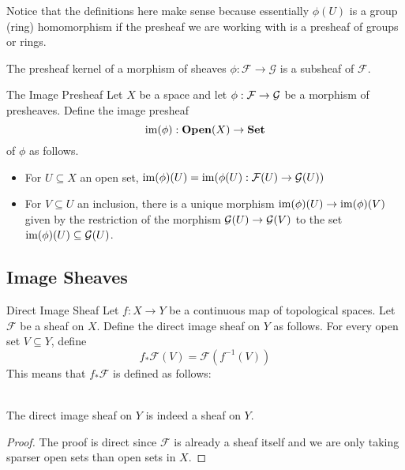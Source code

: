 \documentclass[a4paper]{article}
\begin{document}
Notice that the definitions here make sense because essentially $\phi(U)$ is a group (ring) homomorphism if the presheaf we are working with is a presheaf of groups or rings. 

\begin{prp}{}{} The presheaf kernel of a morphism of sheaves $\phi:\mathcal{F}\to\mathcal{G}$ is a subsheaf of $\mathcal{F}$. 
\end{prp}

\begin{defn}{The Image Presheaf}{} Let $X$ be a space and let $\phi:\mathcal{F}\to\mathcal{G}$ be a morphism of presheaves. Define the image presheaf $$\operatorname{im}(\phi):\bold{Open}(X)\to\bold{Set}$$ of $\phi$ as follows. 
\begin{itemize}
\item For $U\subseteq X$ an open set, $\operatorname{im}(\phi)(U)=\operatorname{im}(\phi(U):\mathcal{F}(U)\to\mathcal{G}(U))$
\item For $V\subseteq U$ an inclusion, there is a unique morphism $\operatorname{im}(\phi)(U)\to\operatorname{im}(\phi)(V)$ given by the restriction of the morphism $\mathcal{G}(U)\to\mathcal{G}(V)$ to the set $\operatorname{im}(\phi)(U)\subseteq\mathcal{G}(U)$. 
\end{itemize}
\end{defn}

\subsection{Image Sheaves}
\begin{defn}{Direct Image Sheaf}{} Let $f:X\to Y$ be a continuous map of topological spaces. Let $\mathcal{F}$ be a sheaf on $X$. Define the direct image sheaf on $Y$ as follows. For every open set $V\subseteq Y$, define $$f_\ast\mathcal{F}(V)=\mathcal{F}(f^{-1}(V))$$ This means that $f_\ast\mathcal{F}$ is defined as follows: \\~\\
\end{defn}

\begin{prp}{}{} The direct image sheaf on $Y$ is indeed a sheaf on $Y$. \tcbline
\begin{proof}
The proof is direct since $\mathcal{F}$ is already a sheaf itself and we are only taking sparser open sets than open sets in $X$. 
\end{proof}
\end{prp}
\end{document}
